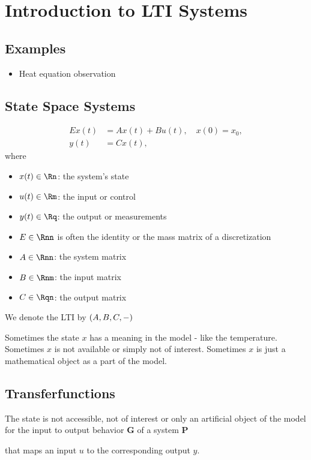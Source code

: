 \section{Introduction to LTI Systems}
\subsection{Examples}
\begin{itemize}
	\item Heat equation observation
\end{itemize}
\subsection{State Space Systems}
\begin{align}\label{eq:lti}
	Ex(t) &= Ax(t) + Bu(t), \quad x(0) = x_0, \\
	y(t) &= Cx(t),
\end{align}
where 
\begin{itemize}
	\item $x(t) \in \Rn$: the system's state
	\item $u(t) \in \Rm$: the input or control
	\item $y(t) \in \Rq$: the output or measurements
	\item $E \in \Rnn$ is often the identity or the mass matrix of a discretization
	\item $A \in \Rnn$: the system matrix
	\item $B \in \Rnm$: the input matrix
	\item $C \in \Rqn$: the output matrix
\end{itemize}

We denote the LTI by $(A,B,C,-)$

Sometimes the state $x$ has a meaning in the model - like the temperature. Sometimes $x$ is not available or simply not of interest. Sometimes $x$ is just a mathematical object as a part of the model. 

\subsection{Transferfunctions}
The state is not accessible, not of interest or only an artificial object of the model for the input to output behavior $\mathbf G$ of a system $\mathbf P$
\begin{figure}[h]
\centering
{}
\end{figure}
that maps an input $u$ to the corresponding output $y$.

